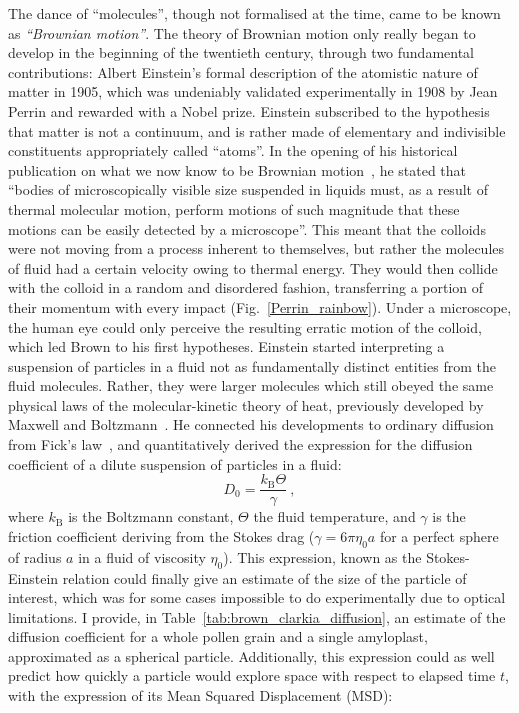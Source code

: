 The dance of ``molecules'', though not formalised at the time, came to be known as \emph{``Brownian motion''}. The theory of Brownian motion only really began to develop in the beginning of the twentieth century, through two fundamental contributions: Albert Einstein's formal description of the atomistic nature of matter in 1905, which was undeniably validated experimentally in 1908 by Jean Perrin and rewarded with a Nobel prize. 
Einstein subscribed to the hypothesis that matter is not a continuum, and is rather made of elementary and indivisible constituents appropriately called ``atoms''. In the opening of his historical publication on what we now know to be Brownian motion~\cite{einstein_uber_1905}, he stated that ``bodies of microscopically visible size suspended in liquids must, as a result of thermal molecular motion, perform motions of such magnitude that these motions can be easily detected by a microscope''. This meant that the colloids were not moving from a process inherent to themselves, but rather the molecules of fluid had a certain velocity owing to thermal energy. They would then collide with the colloid in a random and disordered fashion, transferring a portion of their momentum with every impact (Fig.~\ref{Perrin_rainbow}). Under a microscope, the human eye could only perceive the resulting erratic motion of the colloid, which led Brown to his first hypotheses. Einstein started interpreting a suspension of particles in a fluid not as fundamentally distinct entities from the fluid molecules. Rather, they were larger molecules which still obeyed the same physical laws of the molecular-kinetic theory of heat, previously developed by Maxwell and Boltzmann~\cite{Boltzmann1896, Maxwell1867}. He connected his developments to ordinary diffusion from Fick's law~\cite{Fick1855}, and quantitatively derived the expression for the diffusion coefficient of a dilute suspension of particles in a fluid:
\begin{equation}
\boxed{
    D_0 = \dfrac{k_\mathrm{B}\Theta}{\gamma}
}~,
\label{Eq:Stokes-einstein}
\end{equation} 
where $k_\mathrm{B}$ is the Boltzmann constant, $\Theta$ the fluid temperature, and $\gamma$ is the friction coefficient deriving from the Stokes drag ($\gamma = 6 \pi \eta_0 a$ for a perfect sphere of radius $a$ in a fluid of viscosity $\eta_0$). 
This expression, known as the Stokes-Einstein relation could finally give an estimate of the size of the particle of interest, which was for some cases impossible to do experimentally due to optical limitations. I provide, in Table~\ref{tab:brown_clarkia_diffusion}, an estimate of the diffusion coefficient for a whole pollen grain and a single amyloplast, approximated as a spherical particle. Additionally, this expression could as well predict how quickly a particle would explore space with respect to elapsed time $t$, with the expression of its Mean Squared Displacement (MSD):
